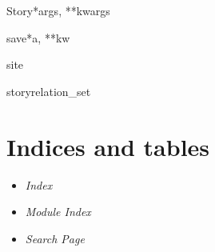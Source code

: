 \documentclass[letterpaper,10pt,english]{manual}
\begin{document}
\begin{classdesc}{Story}{*args, **kwargs}
\hypertarget{stories.models.Story.save}{}\begin{methoddesc}[Story]{save}{*a, **kw}\end{methoddesc}

\hypertarget{stories.models.Story.site}{}\begin{memberdesc}[Story]{site}\end{memberdesc}

\hypertarget{stories.models.Story.storyrelation\_set}{}\begin{memberdesc}[Story]{storyrelation\_set}\end{memberdesc}
\end{classdesc}


\chapter{Indices and tables}
\begin{itemize}
\item {} 
\emph{Index}

\item {} 
\emph{Module Index}

\item {} 
\emph{Search Page}

\end{itemize}


\renewcommand{\indexname}{Module Index}
\printmodindex
\renewcommand{\indexname}{Index}
\printindex
\end{document}
